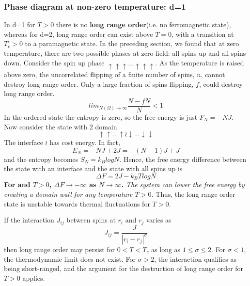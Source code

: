 \documentclass[12pt,titlepage]{article}
\numberwithin{equation}{section}
\begin{document}
\subsubsection{Phase diagram at non-zero temperature: d=1}
In d=1 for $T>0$ there is no \textbf{long range order}(i.e. no ferromagnetic state), whereas for d=2, long range order can exist above $T=0$, with a transition at $T_c>0$ to a paramagnetic state. In the preceding section, we found that at zero temperature, there are two possible phases at zero field: all spins up and all spins down. Consider the spin up phase $\uparrow\uparrow\uparrow...\uparrow\uparrow\uparrow$. As the temperature is raised above zero, the uncorrelated flipping of a finite number of spins, $n$, cannot destroy long range order. Only a large fraction of spins flipping, $f$, could destroy long range order.
\begin{equation}
    lim_{N(\Omega)\rightarrow\infty}\frac{N-fN}{N}<1
\end{equation}
In the ordered state the entropy is zero, so the free energy is just $F_N=-NJ$. Now consider the state with 2 domain
\[\uparrow\uparrow...\uparrow\wr\downarrow...\downarrow\downarrow\]
The interface \(\wr\) has cost energy. In fact,
\begin{equation}
    E_{N}=-NJ+2J=-(N-1)J+J
\end{equation}
and the entropy becomes $S_N=k_BlogN$. Hence, the free energy difference between the state with an interface and the state with all spins up is
\begin{equation}
    \Delta F=2J-k_BTlogN
\end{equation}
\textbf{For and $T>0$, $\Delta F\rightarrow-\infty$ as $N\rightarrow\infty$.} \emph{The system can lower the free energy by creating a domain wall for any temperature $T>0$.} Thus, the long range order state is unstable towards thermal fluctuations for $T>0$.

If the interaction $J_{ij}$ between spins at $r_i$ and $r_j$ varies as
\begin{equation}
    J_{ij}=\frac{J}{|r_i-r_j|^{\sigma}}
\end{equation}
then long range order may persist for $0<T<T_c$ as long as $1\leqslant\sigma\leqslant2$. For $\sigma<1$, the thermodynamic limit does not exist. For $\sigma>2$, the interaction qualifies as being short-ranged, and the argument for the destruction of long range order for $T>0$ applies.
\end{document}
